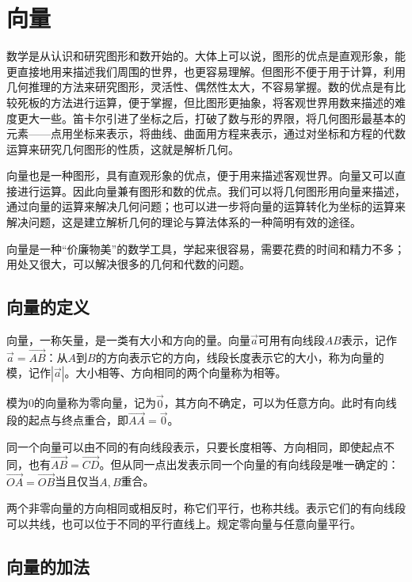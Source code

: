 \section{向量}
数学是从认识和研究图形和数开始的。大体上可以说，图形的优点是直观形象，能更直接地用来描述我们周围的世界，也更容易理解。但图形不便于用于计算，利用几何推理的方法来研究图形，灵活性、偶然性太大，不容易掌握。数的优点是有比较死板的方法进行运算，便于掌握，但比图形更抽象，将客观世界用数来描述的难度更大一些。笛卡尔引进了坐标之后，打破了数与形的界限，将几何图形最基本的元素——点用坐标来表示，将曲线、曲面用方程来表示，通过对坐标和方程的代数运算来研究几何图形的性质，这就是解析几何。

向量也是一种图形，具有直观形象的优点，便于用来描述客观世界。向量又可以直接进行运算。因此向量兼有图形和数的优点。我们可以将几何图形用向量来描述，通过向量的运算来解决几何问题；也可以进一步将向量的运算转化为坐标的运算来解决问题，这是建立解析几何的理论与算法体系的一种简明有效的途径。

向量是一种“价廉物美”的数学工具，学起来很容易，需要花费的时间和精力不多；用处又很大，可以解决很多的几何和代数的问题。

\subsection{向量的定义}

\begin{definition}\label{def:geometric-vector}
向量，一称矢量，是一类有大小和方向的量。向量\(\vec a\)可用有向线段\(AB\)表示，记作\(\vec a=\vec{AB}\)：从\(A\)到\(B\)的方向表示它的方向，线段长度表示它的大小，称为向量的{\heiti 模}，记作\(|\vec a|\)。大小相等、方向相同的两个向量称为相等。
\end{definition}

模为0的向量称为{\heiti 零向量}，记为\(\vec0\)，其方向不确定，可以为任意方向。此时有向线段的起点与终点重合，即\(\vec{AA}=\vec0\)。

同一个向量可以由不同的有向线段表示，只要长度相等、方向相同，即使起点不同，也有\(\vec{AB}=\vec{CD}\)。但从同一点出发表示同一个向量的有向线段是唯一确定的：\(\vec{OA}=\vec{OB}\)当且仅当\(A,B\)重合。

两个非零向量的方向相同或相反时，称它们{\heiti 平行}，也称{\heiti 共线}。表示它们的有向线段可以共线，也可以位于不同的平行直线上。规定零向量与任意向量平行。

\newpage
\subsection{向量的加法}

